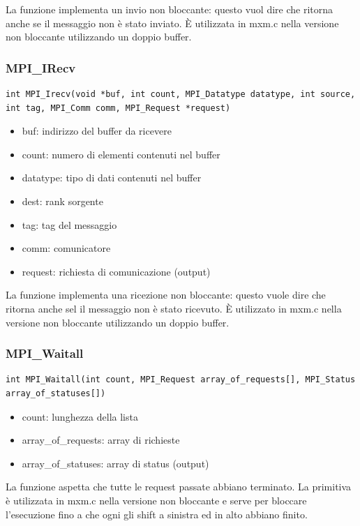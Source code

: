 La funzione implementa un invio non bloccante: questo vuol dire che ritorna anche se il messaggio non \`{e} stato inviato. \`{E} utilizzata in mxm.c nella versione non bloccante utilizzando un doppio buffer.

\subsubsection{MPI\_IRecv}
\begin{lstlisting}
int MPI_Irecv(void *buf, int count, MPI_Datatype datatype, int source, int tag, MPI_Comm comm, MPI_Request *request)
\end{lstlisting}
\begin{itemize}
  \item buf: indirizzo del buffer da ricevere
  \item count: numero di elementi contenuti nel buffer
  \item datatype: tipo di dati contenuti nel buffer
  \item dest: rank sorgente
  \item tag: tag del messaggio
  \item comm: comunicatore
  \item request: richiesta di comunicazione (output)
\end{itemize}

La funzione implementa una ricezione non bloccante: questo vuole dire che ritorna anche sel il messaggio non \`{e} stato ricevuto. \`{E} utilizzato in mxm.c nella versione non bloccante utilizzando un doppio buffer.

\subsubsection{MPI\_Waitall}
\begin{lstlisting}
int MPI_Waitall(int count, MPI_Request array_of_requests[], MPI_Status array_of_statuses[])
\end{lstlisting}
\begin{itemize}
  \item count: lunghezza della lista
  \item array\_of\_requests: array di richieste
  \item array\_of\_statuses: array di status (output)
\end{itemize}

La funzione aspetta che tutte le request passate abbiano terminato. La primitiva \`{e} utilizzata in mxm.c nella versione non bloccante e serve per bloccare l'esecuzione fino a che ogni gli shift a sinistra ed in alto abbiano finito.

